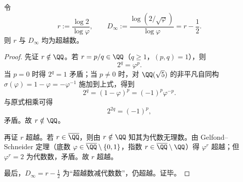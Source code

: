 \begin{proposition}\label{prop:near1-log2-over-logphi-Dinfty-transcendence-alt}
令
\[
r:=\frac{\log 2}{\log\varphi},
\qquad
D_\infty:=\frac{\log(2/\sqrt\varphi)}{\log\varphi}=r-\frac12.
\]
则 \(r\) 与 \(D_\infty\) 均为超越数。
\end{proposition}
\begin{proof}
先证 \(r\notin\QQ\)。若 \(r=p/q\in\QQ\)（\(q\ge 1\)，\((p,q)=1\)），则
\[
2^q=\varphi^p.
\]
当 \(p=0\) 时得 \(2^q=1\) 矛盾；当 \(p\neq 0\) 时，对 \(\QQ(\sqrt5)\) 的非平凡自同构 \(\sigma(\varphi)=1-\varphi=-\varphi^{-1}\) 施加到上式，得到
\[
2^q=(1-\varphi)^p=(-1)^p\varphi^{-p}.
\]
与原式相乘可得
\[
2^{2q}=(-1)^p,
\]
矛盾。故 \(r\notin\QQ\)。

再证 \(r\) 超越。若 \(r\in\overline{\QQ}\)，则由 \(r\notin\QQ\) 知其为代数无理数。由 Gelfond--Schneider 定理（底数 \(\varphi\in\overline{\QQ}\setminus\{0,1\}\)，指数 \(r\in\overline{\QQ}\setminus\QQ\)）得 \(\varphi^r\) 超越；但 \(\varphi^r=2\) 为代数数，矛盾。故 \(r\) 超越。

最后，\(D_\infty=r-\frac12\) 为“超越数减代数数”，仍超越。证毕。
\end{proof}

